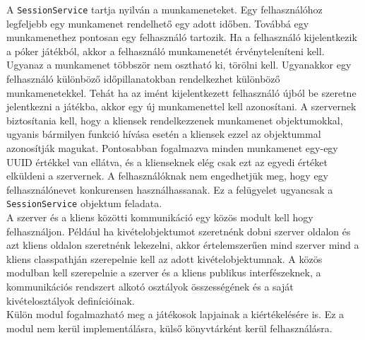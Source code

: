 A \texttt{SessionService} tartja nyilván a munkameneteket. Egy felhasználóhoz legfeljebb egy munkamenet rendelhető egy adott időben. Továbbá egy munkamenethez pontosan egy felhasználó tartozik. Ha a felhasználó kijelentkezik a póker játékból, akkor a felhasználó munkamenetét érvényteleníteni kell. Ugyanaz a munkamenet többször nem osztható ki, törölni kell. Ugyanakkor egy felhasználó különböző időpillanatokban rendelkezhet különböző munkamenetekkel. Tehát ha az imént kijelentkezett felhasználó újból be szeretne jelentkezni a játékba, akkor egy új munkamenettel kell azonosítani. A szervernek biztosítania kell, hogy a kliensek rendelkezzenek munkamenet objektumokkal, ugyanis bármilyen funkció hívása esetén a kliensek ezzel az objektummal azonosítják magukat. Pontosabban fogalmazva minden munkamenet egy-egy UUID értékkel van ellátva, és a klienseknek elég csak ezt az egyedi értéket elküldeni a szervernek. A felhasználóknak nem engedhetjük meg, hogy egy felhasználónevet konkurensen használhassanak. Ez a felügyelet ugyancsak a \texttt{SessionService} objektum feladata. \\
A szerver és a kliens közötti kommunikáció egy közös modult kell hogy felhasználjon. Például ha kivételobjektumot szeretnénk dobni szerver oldalon és azt kliens oldalon szeretnénk lekezelni, akkor értelemszerűen mind szerver mind a kliens classpathján szerepelnie kell az adott kivételobjektumnak. A közös modulban kell szerepelnie a szerver és a kliens publikus interfészeknek, a kommunikációs rendszert alkotó osztályok összességének és a saját kivételosztályok definícióinak. \\
Külön modul fogalmazható meg a játékosok lapjainak a kiértékelésére is. Ez a modul nem kerül implementálásra, külső könyvtárként kerül felhasználásra.

